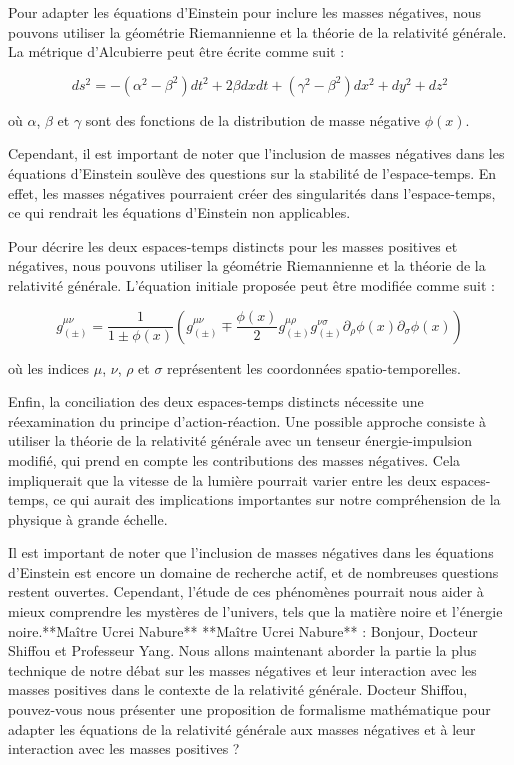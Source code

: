 Pour adapter les équations d'Einstein pour inclure les masses négatives, nous pouvons utiliser la géométrie Riemannienne et la théorie de la relativité générale. La métrique d'Alcubierre peut être écrite comme suit :

$$ds^2 = -\left(\alpha^2 - \beta^2\right)dt^2 + 2\beta dx dt + \left(\gamma^2 - \beta^2\right)dx^2 + dy^2 + dz^2$$

où $\alpha$, $\beta$ et $\gamma$ sont des fonctions de la distribution de masse négative $\phi(x)$.

Cependant, il est important de noter que l'inclusion de masses négatives dans les équations d'Einstein soulève des questions sur la stabilité de l'espace-temps. En effet, les masses négatives pourraient créer des singularités dans l'espace-temps, ce qui rendrait les équations d'Einstein non applicables.

Pour décrire les deux espaces-temps distincts pour les masses positives et négatives, nous pouvons utiliser la géométrie Riemannienne et la théorie de la relativité générale. L'équation initiale proposée peut être modifiée comme suit :

$$g^{\mu \nu}_{(\pm)} = \frac{1}{1 \pm \phi(x)} \left(g^{\mu \nu}_{(\pm)} \mp \frac{\phi(x)}{2} g^{\mu \rho}_{(\pm)} g^{\nu \sigma}_{(\pm)} \partial_\rho \phi(x) \partial_\sigma \phi(x)\right)$$

où les indices $\mu$, $\nu$, $\rho$ et $\sigma$ représentent les coordonnées spatio-temporelles.

Enfin, la conciliation des deux espaces-temps distincts nécessite une réexamination du principe d'action-réaction. Une possible approche consiste à utiliser la théorie de la relativité générale avec un tenseur énergie-impulsion modifié, qui prend en compte les contributions des masses négatives. Cela impliquerait que la vitesse de la lumière pourrait varier entre les deux espaces-temps, ce qui aurait des implications importantes sur notre compréhension de la physique à grande échelle.

Il est important de noter que l'inclusion de masses négatives dans les équations d'Einstein est encore un domaine de recherche actif, et de nombreuses questions restent ouvertes. Cependant, l'étude de ces phénomènes pourrait nous aider à mieux comprendre les mystères de l'univers, tels que la matière noire et l'énergie noire.**Maître Ucrei Nabure**
**Maître Ucrei Nabure** : Bonjour, Docteur Shiffou et Professeur Yang. Nous allons maintenant aborder la partie la plus technique de notre débat sur les masses négatives et leur interaction avec les masses positives dans le contexte de la relativité générale. Docteur Shiffou, pouvez-vous nous présenter une proposition de formalisme mathématique pour adapter les équations de la relativité générale aux masses négatives et à leur interaction avec les masses positives ?

